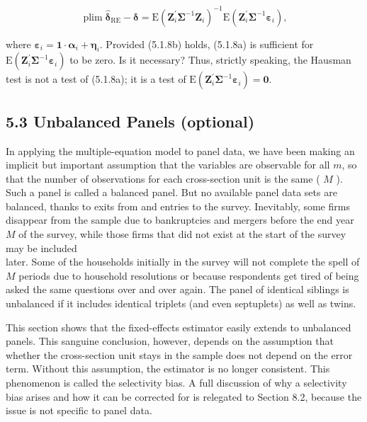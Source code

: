 \documentclass[10pt]{article}
\begin{document}
$$
\operatorname{plim} \hat{\boldsymbol{\delta}}_{\mathrm{RE}}-\boldsymbol{\delta}=\mathrm{E}\left(\mathbf{Z}_{i}^{\prime} \boldsymbol{\Sigma}^{-1} \mathbf{Z}_{i}\right)^{-1} \mathrm{E}\left(\mathbf{Z}_{i}^{\prime} \boldsymbol{\Sigma}^{-1} \boldsymbol{\varepsilon}_{i}\right),
$$

where $\boldsymbol{\varepsilon}_{i}=\mathbf{1} \cdot \boldsymbol{\alpha}_{i}+\boldsymbol{\eta}_{i}$. Provided (5.1.8b) holds, (5.1.8a) is sufficient for $\mathrm{E}\left(\mathbf{Z}_{i}^{\prime} \boldsymbol{\Sigma}^{-1} \boldsymbol{\varepsilon}_{i}\right)$ to be zero. Is it necessary? Thus, strictly speaking, the Hausman test is not a test of (5.1.8a); it is a test of $\mathrm{E}\left(\mathbf{Z}_{i}^{\prime} \boldsymbol{\Sigma}^{-1} \boldsymbol{\varepsilon}_{i}\right)=\mathbf{0}$.

\subsection*{5.3 Unbalanced Panels (optional)}
In applying the multiple-equation model to panel data, we have been making an implicit but important assumption that the variables are observable for all $m$, so that the number of observations for each cross-section unit is the same ( $M$ ). Such a panel is called a balanced panel. But no available panel data sets are balanced, thanks to exits from and entries to the survey. Inevitably, some firms disappear from the sample due to bankruptcies and mergers before the end year $M$ of the survey, while those firms that did not exist at the start of the survey may be included\\
later. Some of the households initially in the survey will not complete the spell of $M$ periods due to household resolutions or because respondents get tired of being asked the same questions over and over again. The panel of identical siblings is unbalanced if it includes identical triplets (and even septuplets) as well as twins.

This section shows that the fixed-effects estimator easily extends to unbalanced panels. This sanguine conclusion, however, depends on the assumption that whether the cross-section unit stays in the sample does not depend on the error term. Without this assumption, the estimator is no longer consistent. This phenomenon is called the selectivity bias. A full discussion of why a selectivity bias arises and how it can be corrected for is relegated to Section 8.2, because the issue is not specific to panel data.
\end{document}
